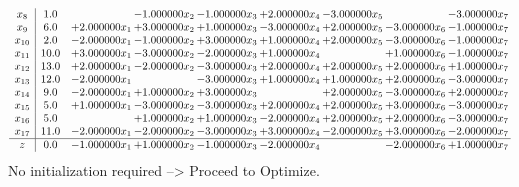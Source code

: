 \documentclass[10pt]{article}
\begin{document}
\[\begin{array}{c| c c@{\hskip 2pt} c@{\hskip 2pt} c@{\hskip 2pt} c@{\hskip 2pt} c@{\hskip 2pt} c@{\hskip 2pt} c@{\hskip 2pt} }
 x_{8}   &  1.0  &   & -1.000000 x_{2} & -1.000000 x_{3} & + 2.000000 x_{4} & -3.000000 x_{5} &   & -3.000000 x_{7}\\
 x_{9}   &  6.0 & + 2.000000 x_{1} & + 3.000000 x_{2} & + 1.000000 x_{3} & -3.000000 x_{4} & + 2.000000 x_{5} & -3.000000 x_{6} & -1.000000 x_{7}\\
 x_{10}   &  2.0 & -2.000000 x_{1} & -1.000000 x_{2} & + 3.000000 x_{3} & + 1.000000 x_{4} & + 2.000000 x_{5} & -3.000000 x_{6} & -1.000000 x_{7}\\
 x_{11}   &  10.0 & + 3.000000 x_{1} & -3.000000 x_{2} & -2.000000 x_{3} & + 1.000000 x_{4} &   & + 1.000000 x_{6} & -1.000000 x_{7}\\
 x_{12}   &  13.0 & + 2.000000 x_{1} & -2.000000 x_{2} & -3.000000 x_{3} & + 2.000000 x_{4} & + 2.000000 x_{5} & + 2.000000 x_{6} & + 1.000000 x_{7}\\
 x_{13}   &  12.0 & -2.000000 x_{1} &   & -3.000000 x_{3} & + 1.000000 x_{4} & + 1.000000 x_{5} & + 2.000000 x_{6} & -3.000000 x_{7}\\
 x_{14}   &  9.0 & -2.000000 x_{1} & + 1.000000 x_{2} & + 3.000000 x_{3} &   & + 2.000000 x_{5} & -3.000000 x_{6} & + 2.000000 x_{7}\\
 x_{15}   &  5.0 & + 1.000000 x_{1} & -3.000000 x_{2} & -3.000000 x_{3} & + 2.000000 x_{4} & + 2.000000 x_{5} & + 3.000000 x_{6} & -3.000000 x_{7}\\
 x_{16}   &  5.0  &   & + 1.000000 x_{2} & + 1.000000 x_{3} & -2.000000 x_{4} & + 2.000000 x_{5} & + 2.000000 x_{6} & -3.000000 x_{7}\\
 x_{17}   &  11.0 & -2.000000 x_{1} & -2.000000 x_{2} & -3.000000 x_{3} & + 3.000000 x_{4} & -2.000000 x_{5} & + 3.000000 x_{6} & -2.000000 x_{7}\\
\hline
z    &  0.0 & -1.000000 x_{1} & + 1.000000 x_{2} & -1.000000 x_{3} & -2.000000 x_{4} &   & -2.000000 x_{6} & + 1.000000 x_{7}\\
\end{array}\]
No initialization required --> Proceed to Optimize. 
\end{document}
